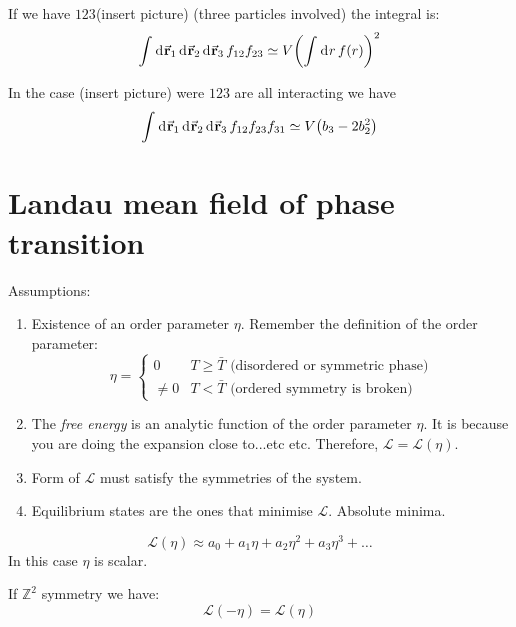 \documentclass[../main/main.tex]{subfiles}
\begin{document}
If we have \( 123 \)(insert picture) (three particles involved) the integral is:
\begin{equation}
  \int_{}^{} \dd[]{\va{r}_1}  \dd[]{\va{r}_2}   \dd[]{\va{r}_3}  f_{12} f_{23}
  \simeq V  \qty(  \int_{}^{} \dd[]{r} f(r)  )^2
\end{equation}

In the case (insert picture) were \( 123 \) are all interacting we have
\begin{equation}
  \int_{}^{} \dd[]{\va{r}_1}  \dd[]{\va{r}_2}   \dd[]{\va{r}_3}  f_{12} f_{23} f_{31}
  \simeq V  \qty( b_3 - 2 b_2^2  )
\end{equation}

\section{Landau mean field of phase transition}
Assumptions:
\begin{enumerate}
\item Existence of an order parameter \( \eta   \). Remember the definition of the order parameter:
\begin{equation}
  \eta   = \begin{cases}
    0 & T \ge \bar{T} \text{ (disordered or symmetric phase)}\\
    \neq 0 & T < \bar{T}  \text{ (ordered symmetry is broken)}
\end{cases}
\end{equation}
\item The \emph{free energy} is an analytic function of the order parameter \( \eta   \). It is because you are doing the expansion close to...etc etc. Therefore, \( \mathcal{L} = \mathcal{L} (\eta ) \).
\item Form of \( \mathcal{L} \) must satisfy the symmetries of the system.
\item Equilibrium states are the ones that minimise \( \mathcal{L} \). Absolute minima.
\end{enumerate}
\begin{equation}
  \mathcal{L} (\eta ) \approx a_0 + a_1 \eta + a_2 \eta ^2 + a_3 \eta ^3 + \dots
\end{equation}
In this case \( \eta  \) is scalar.

If \( \mathbb{Z}^2 \) symmetry we have:
\begin{equation}
  \mathcal{L} (-\eta ) =   \mathcal{L} (\eta )
\end{equation}
\end{document}
